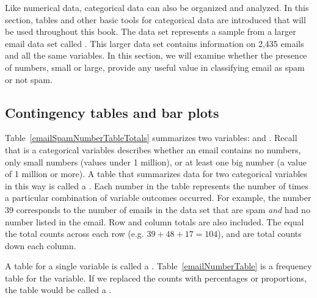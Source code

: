 
Like numerical data, categorical data can also be organized and analyzed. In this section, tables and other basic tools for categorical data are introduced that will be used throughout this book. The  data set represents a sample from a larger email data set called . This larger data set contains information on 2,435 emails and all the same variables. In this section, we will examine whether the presence of numbers, small or large, provide any useful value in classifying email as spam or not spam.


\subsection{Contingency tables and bar plots}


Table~\ref{emailSpamNumberTableTotals} summarizes two variables:  and . Recall that  is a categorical variables describes whether an email contains no numbers, only small numbers (values under 1 million), or at least one big number (a value of 1 million or more). A table that summarizes data for two categorical variables in this way is called a . Each number in the table represents the number of times a particular combination of variable outcomes occurred. For example, the number 39 corresponds to the number of emails in the data set that are spam \emph{and} had no number listed in the email. Row and column totals are also included. The   equal the total counts across each row (e.g. $39 + 48 + 17 = 104$), and   are total counts down each column.

A table for a single variable is called a . Table~\ref{emailNumberTable} is a frequency table for the  variable. If we replaced the counts with percentages or proportions, the table would be called a .

